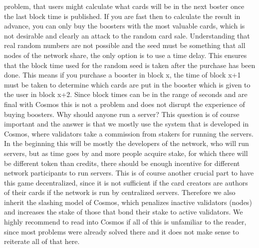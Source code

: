 \documentclass{article}
\begin{document}
problem, that users might calculate what cards will be in the next boster once the last block time is published. If you are fast then to calculate the result in advance, you can only buy the boosters with the most valuable cards, which is not desirable and clearly an attack to the random card sale. Understanding that real random numbers are not possible and the seed must be something that all nodes of the network share, the only option is to use a time delay. This ensures that the block time used for the random seed is taken after the purchase has been done. This means if you purchase a booster in block x, the time of block x+1 must be taken to determine which cards are put in the booster which is given to the user in block x+2. Since block times can be in the range of seconds and are final with Cosmos this is not a problem and does not disrupt the experience of buying boosters. 
%
\newline\newline
%
Why should anyone run a server? This question is of course important and the answer is that we mostly use the system that is developed in Cosmos, where validators take a commission from stakers for running the servers. In the beginning this will be mostly the developers of the network, who will run servers, but as time goes by and more people acquire stake, for which there will be different token than credits, there should be enough incentive for different network participants to run servers. This is of course another crucial part to have this game decentralized, since it is not sufficient if the card creators are authors of their cards if the network is run by centralized servers. Therefore we also inherit the slashing model of Cosmos, which penalizes inactive validators (nodes) and increases the stake of those that bond their stake to active validators. We highly recommend to read into Cosmos if all of this is unfamiliar to the reader, since most problems were already solved there and it does not make sense to reiterate all of that here.
%
\printbibliography[heading=bibliography]
%
\end{document}
